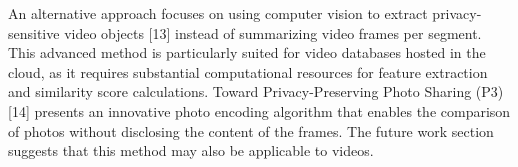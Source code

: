 An alternative approach focuses on using computer vision to extract privacy-sensitive video objects [13] instead of summarizing video frames per segment. This advanced method is particularly suited for video databases hosted in the cloud, as it requires substantial computational resources for feature extraction and similarity score calculations.
Toward Privacy-Preserving Photo Sharing (P3) [14] presents an innovative photo encoding algorithm that enables the comparison of photos without disclosing the content of the frames. The future work section suggests that this method may also be applicable to videos.
